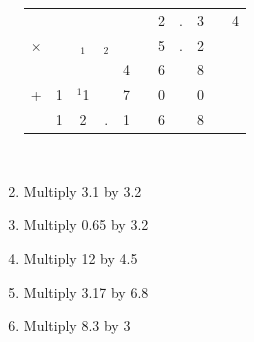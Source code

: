 \documentclass[12pt]{article}
\begin{document}
\begin{enumerate}
\begin{center}
\begin{tabular}{c@{\,}c@{\,}c@{\,}c@{\,}c@{\,}c@{\,}c@{\,}c@{\,}c@{\,}c@{\,}c}
        & &       &    & & &2&.&3& &4\\
$\times$& & $_1$  &$_2$& & &5&.&2& &  \\
\hline
        & &       &    &4& &6& &8& & \\
+       &1&$^{1}$1&    &7& &0& &0& & \\
\hline
        &1&2      &.   &1& &6& &8& & \\
\hline
\hline
\end{tabular}\\
\end{center}

\item Multiply 3.1 by 3.2
\item Multiply 0.65 by 3.2
\item Multiply 12 by 4.5
\item Multiply 3.17 by 6.8
\item Multiply 8.3 by 3

\end{enumerate}
\end{document}
